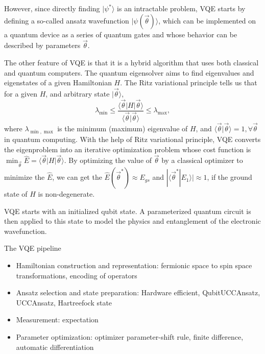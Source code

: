 However, since directly finding $|\psi^*\rangle$ is an intractable problem, VQE starts by defining a so-called ansatz wavefunction $|\psi(\vec{\theta})\rangle$, which can be implemented on a quantum device as a series of quantum gates and whose behavior can be described by parameters $\vec{\theta}$.

The other feature of VQE is that it is a hybrid algorithm that uses both classical and quantum computers.
The quantum eigensolver aims to find eigenvalues and eigenstates of a given Hamiltonian $H$.
The Ritz variational principle tells us that for a given $H$, and arbitrary state $|\vec{\theta}\rangle$,
\begin{equation}
    \lambda_{\min}\leq \frac{\langle \vec{\theta} |H| \vec{\theta}\rangle}{\langle \vec{\theta}|\vec{\theta}\rangle} \leq \lambda_{\max},
\end{equation}
where $\lambda_{\min, \max}$ is the minimum (maximum) eigenvalue of $H$, and $\langle \vec{\theta}|\vec{\theta}\rangle = 1, \forall \vec{\theta}$ in quantum computing.
With the help of Ritz variational principle, VQE converts the eigenproblem into an iterative optimization problem whose cost function is $\min_{\vec{\theta}}\hat{E}= \langle \vec{\theta} |H| \vec{\theta}\rangle$.
By optimizing the value of $\vec{\theta}$ by a classical optimizer to minimize the $\hat{E}$, we can get the $\hat{E}(\vec{\theta}^*)\approx E_{gs}$ and $|\langle \vec{\theta}^*|E_1\rangle| \approx 1$, if the ground state of $H$ is non-degenerate.

VQE starts with an initialized qubit state. A parameterized quantum circuit is then applied to this state to model the physics and entanglement of the electronic wavefunction.

The VQE pipeline
\begin{itemize}
    \item Hamiltonian construction and representation: fermionic space to spin space transformations, encoding of operators
    \item Ansatz selection and state preparation: Hardware efficient, QubitUCCAnsatz, UCCAnsatz, Hartreefock state
    \item Measurement: expectation
    \item Parameter optimization: optimizer parameter-shift rule, finite difference, automatic differentiation
\end{itemize}



